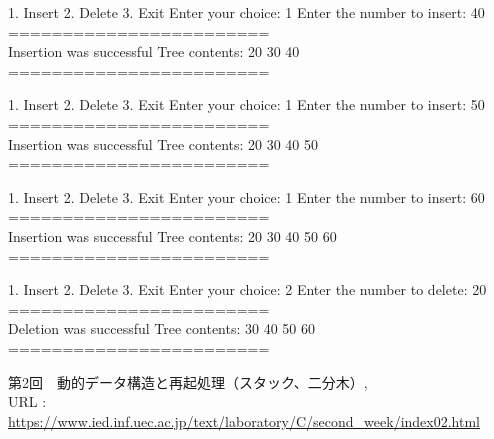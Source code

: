 \documentclass[]{jsarticle}
\begin{document}
1. Insert
2. Delete
3. Exit
Enter your choice: 1
Enter the number to insert: 40\\
========================\\
Insertion was successful
Tree contents: 20 30 40 \\
========================

1. Insert
2. Delete
3. Exit
Enter your choice: 1
Enter the number to insert: 50\\
========================\\
Insertion was successful
Tree contents: 20 30 40 50 \\
========================

1. Insert
2. Delete
3. Exit
Enter your choice: 1
Enter the number to insert: 60\\
========================\\
Insertion was successful
Tree contents: 20 30 40 50 60 \\
========================

1. Insert
2. Delete
3. Exit
Enter your choice: 2
Enter the number to delete: 20\\
========================\\
Deletion was successful
Tree contents: 30 40 50 60 \\
========================

\newpage
\begin{thebibliography}{99}
   第2回　動的データ構造と再起処理（スタック、二分木）, \\URL : \url{https://www.ied.inf.uec.ac.jp/text/laboratory/C/second_week/index02.html}
\end{thebibliography}
\end{document}
